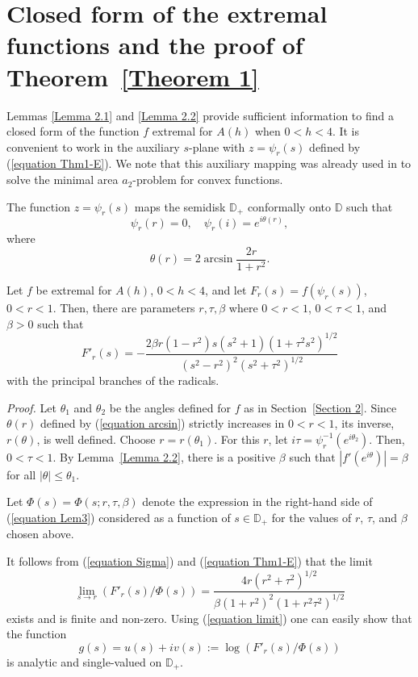 \documentclass[mn,a4paper,fleqn]{w-art}
\newcommand{\be}{\begin{equation}}
\newcommand{\ee}{\end{equation}}
\newcommand{\bl}{\begin{lemma}}
\newcommand{\el}{\end{lemma}}
\begin{document}
{\section{Closed form of the extremal functions and the proof of Theorem~\ref{Theorem 1}}
\label{Section 3} %
\setcounter{equation}{0}  %

Lemmas \ref{Lemma 2.1} and \ref{Lemma 2.2} provide sufficient
information to find a closed form of the function $f$ extremal for
$A(h)$ when $0<h<4$. It is convenient to work in the
auxiliary $s$-plane with $z=\psi_r(s)$ defined by (\ref{equation Thm1-E}).
We note that this auxiliary mapping was already used in
\cite{AShS2} to solve the minimal area $a_2$-problem for convex
functions.

The function $z=\psi_r(s)$ maps the semidisk ${\mathbb{D}}_+$
conformally onto
$\mathbb{D}$ such that %
$$  %
\psi_r(r)=0,\quad \psi_r(i)=e^{i\theta(r)}, %
$$  %
where %
\be  \label{equation arcsin}  %
\theta(r)=2\arcsin \frac{2r}{1+r^2}.  %
\ee  %

\bl \label{Lemma 3.1}  %
Let $f$ be extremal for $A(h)$, $0<h<4$, and let
$F_r(s)=f(\psi_r(s))$, $0<r<1$. Then, there are parameters $r,\tau,\beta$ where $0<r<1$, $0<\tau<1$, and $\beta>0$ such that  %
\be  \label{equation Lem3} %
F'_r(s)=-\frac{2\beta
r(1-r^2)s(s^2+1)(1+\tau^2s^2)^{1/2}}{(s^2-r^2)^2(s^2+\tau^2)^{1/2}} %
\ee  %
with the principal branches of the radicals.  %
\el  %

\textit{Proof.} Let $\theta_1$ and $\theta_2$ be the angles
defined for $f$ as in Section~\ref{Section 2}. Since $\theta(r)$
defined by (\ref{equation arcsin}) strictly increases in $0<r<1$, its
inverse, $r(\theta)$, is well defined. Choose $r=r(\theta_1)$. For
this $r$, let $i\tau=\psi_r^{-1}(e^{i\theta_2})$. Then, $0<\tau<1$.
By Lemma~\ref{Lemma 2.2}, there is a positive $\beta$ such that
$|f'(e^{i\theta})|=\beta$ for all $|\theta|\le \theta_1$.

Let $\Phi(s)=\Phi(s;r,\tau,\beta)$ denote the expression in the
right-hand side of (\ref{equation Lem3}) considered as a function
of $s\in \mathbb{D}_+$ for the values of $r$, $\tau$, and $\beta$
chosen above.

It follows from (\ref{equation Sigma}) and (\ref{equation Thm1-E})
that the limit %
\be  \label{equation limit}  %
\lim_{s\to r}\left(F'_r(s)/\Phi(s)\right) =\frac{4r(r^2+\tau^2)^{1/2}}{\beta(1+r^2)^2(1+r^2\tau^2)^{1/2}} %
\ee  %
exists and is finite and non-zero.  Using (\ref{equation limit}) one
can easily show that the function  %
$$  %
g(s)=u(s)+iv(s):=\log\left(F'_r(s)/\Phi(s)\right)  %
$$  %
is analytic and single-valued on $\mathbb{D}_+$.

}
\end{document}

